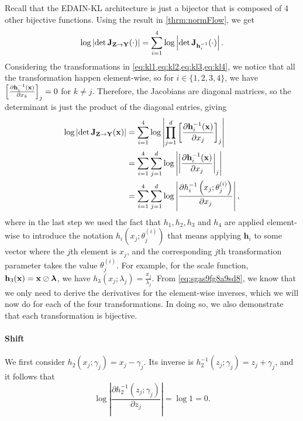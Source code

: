 \documentclass{statsmsc}
\begin{document}
{Recall that the \ac{EDAIN-KL} architecture is just a bijector that is composed of 4 other bijective
functions. Using the result in \cref{thrm:normFlow}, we get
\begin{equation}
    \log \left|\det \mathbf{J}_{\mathbf{Z} \rightarrow {\mathbf{Y}}}(\cdot)  \right|
    = \sum^{4}_{i=1} \log \left|\det \mathbf{J}_{\mathbf{h}_i^{-1}}(\cdot) \right|.
\end{equation}
Considering the transformations in \cref{eq:kl1,eq:kl2,eq:kl3,eq:kl4}, we notice that all the
transformation happen element-wise, so for $i\in\{1,2,3,4\}$, we have
$\left[\frac{\partial \mathbf{h}_i^{-1}(\mathbf{x})}{\partial x_{k}}\right]_j =0$ for $k \neq j$.
Therefore, the Jacobians are diagonal matrices, so the determinant is just the product of the
diagonal entries, giving
\begin{align}
    \log \left|\det \mathbf{J}_{\mathbf{Z} \rightarrow {\mathbf{Y}}}(\mathbf{x})  \right|
    & = \sum^{4}_{i=1} \log \left| \prod_{j=1}^d \left[\frac{\partial \mathbf{h}_i^{-1}(\mathbf{x})}{\partial x_j}\right]_j   \right| \\
    & = \sum^{4}_{i=1} \sum_{j=1}^d \log \left| \left|\frac{\partial \mathbf{h}_i^{-1}(\mathbf{x})}{\partial x_j}\right|_j   \right| \\
    & = \sum^{4}_{i=1} \sum_{j=1}^d \log \left| \frac{\partial h_i^{-1}\left(x_j;\theta_j^{(i)}\right)}{\partial x_j}  \right|, \label{eq:sgas9fg8a9sd8}
\end{align}
where in the last step we used the fact that $h_1,h_2,h_3$ and $h_4$ are applied element-wise
to introduce the notation $h_i(x_j;\theta^{(i)}_j)$ that means applying $\mathbf{h}_i$ to
some vector where the $j$th element is $x_j$, and the corresponding $j$th transformation
parameter takes the value $\theta^{(i)}_j$. For example, for the scale
function, $\mathbf{h}_3(\mathbf{x})=\mathbf{x} \oslash \bm\lambda$, we have
$h_3(x_j;\lambda_j)=\frac{x_j}{\lambda_j}$.
From \cref{eq:sgas9fg8a9sd8}, we know that we only need to derive the derivatives for
the element-wise inverses, which we will now do for each of the four transformations.
In doing so, we also demonstrate that each transformation is bijective.

\paragraph{Shift}%
\label{par:Shift}

We first consider $h_2(x_j;\gamma_j)=x_j-\gamma_j$. Its inverse is $h_2^{-1}(z_j;\gamma_j)=z_j+\gamma_j$, and it follows that
\begin{equation}
    \log \left|\frac{\partial h_2^{-1}(z_j ; \gamma_j)}{\partial z_j} \right|
    = \log 1 = 0.
\end{equation}

}
\end{document}
